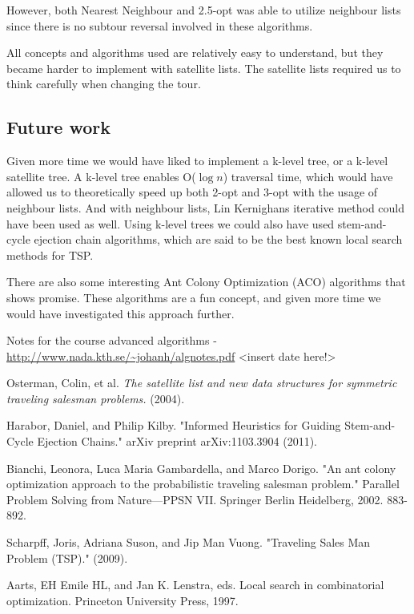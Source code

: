 \documentclass[paper=a4, fontsize=11pt,numbers=endperiod]{scrartcl} %
\numberwithin{equation}{section} %
\numberwithin{figure}{section} %
\numberwithin{table}{section} %
\begin{document}
However, both Nearest Neighbour and 2.5-opt was able to utilize neighbour lists since there is no subtour reversal involved in these algorithms.

All concepts and algorithms used are relatively easy to understand, but they became harder to implement with satellite lists.
The satellite lists required us to think carefully when changing the tour.


\subsection{Future work}

Given more time we would have liked to implement a k-level tree, or a k-level satellite tree.
A k-level tree enables O($\log{n}$) traversal time, which would have allowed us to theoretically speed up both 2-opt and 3-opt with the usage of neighbour lists. And with neighbour lists, Lin Kernighans iterative method could have been used as well. Using k-level trees we could also have used stem-and-cycle ejection chain algorithms, which are said to be the best known local search methods for TSP.\cite{stem-cycle}

There are also some interesting Ant Colony Optimization (ACO) algorithms that shows promise. These algorithms are a fun concept, and given more time we would have investigated this approach further. \cite{ACO}




\newpage
\begin{thebibliography}{9}

 Notes for the course advanced algorithms - \url{http://www.nada.kth.se/~johanh/algnotes.pdf} <insert date here!>
 
 Osterman, Colin, et al. \emph{The satellite list and new data structures for symmetric traveling salesman problems.} (2004).

 Harabor, Daniel, and Philip Kilby. "Informed Heuristics for Guiding Stem-and-Cycle Ejection Chains." arXiv preprint arXiv:1103.3904 (2011).

 Bianchi, Leonora, Luca Maria Gambardella, and Marco Dorigo. "An ant colony optimization approach to the probabilistic traveling salesman problem." Parallel Problem Solving from Nature—PPSN VII. Springer Berlin Heidelberg, 2002. 883-892.

 Scharpff, Joris, Adriana Suson, and Jip Man Vuong. "Traveling Sales Man Problem (TSP)." (2009).

 Aarts, EH Emile HL, and Jan K. Lenstra, eds. Local search in combinatorial optimization. Princeton University Press, 1997.

\end{thebibliography}
\end{document}
